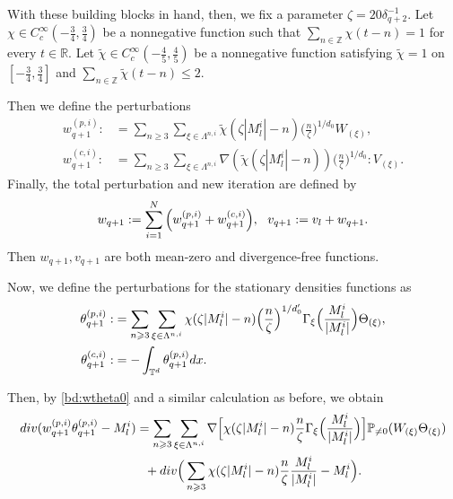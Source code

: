 \documentclass[10pt,a4paper]{amsart}
\numberwithin{equation}{section}
\def\[{{\Big[}}
\def\]{{\Big]}}
\def\({{\Big(}}
\def\){{\Big)}}
\def\dif{{\mathord{{\rm d}}}}
\def\mP{{\mathbb P}}
\def\geq{\geqslant}
\def\leq{\leqslant}
\def\div{\mathord{{\rm div}}}
\def\[{{\Big[}}
\def\]{{\Big]}}
\def\({{\Big(}}
\def\){{\Big)}}
\def\dif{{\mathord{{\rm d}}}}
\def\geq{\geqslant}
\def\leq{\leqslant}
\def\div{\mathord{{\rm div}}}
\begin{document}
With these building blocks in hand, then, we fix a  parameter $\zeta = 20\delta_{q+2}^{-1}$.  Let
$
\chi\in C_c^\infty(-\frac34,\frac34)
$
be a nonnegative function such that
$
\sum_{n\in\mathbb{Z}}\chi(t-n)=1
$
for every $t\in\mathbb{R}$.
Let
$
\tilde{\chi}\in C_c^\infty(-\frac45,\frac45)
$
be a nonnegative function satisfying
$
\tilde{\chi}=1
$
on
$
[-\frac34,\frac34]
$
and
$
\sum_{n\in\mathbb{Z}}\tilde{\chi}(t-n)\leq2.
$

Then we define the perturbations
\begin{align*}
w_{q+1}^{(p,i)}:&=\sum_{n\geq3}\sum_{\xi\in\Lambda^{n,i}}\tilde{\chi}(\zeta |M^i_l|-n)\(\frac{n}{\zeta }\)^{1/d_0}W_{ (\xi)},\\
w_{q+1}^{(c,i)}:&=\sum_{n\geq3}\sum_{\xi\in\Lambda^{n,i}}\nabla( \tilde{\chi}(\zeta |M^i_l|-n))\(\frac{n}{\zeta }\)^{1/{d_0}}:V_{ (\xi)}.
\end{align*}
Finally, the total perturbation and new iteration are defined by
\begin{align}
w_{q+1}:=\sum_{i=1}^N\(w_{q+1}^{(p,i)}+w_{q+1}^{(c,i)}\),\ \ v_{q+1}:=v_l+w_{q+1}.\notag
\end{align} 
Then  $w_{q+1},v_{q+1}$ are both mean-zero and divergence-free functions.

 
Now,  we define the perturbations for the stationary  densities functions as
\begin{align}
\theta_{q+1}^{(p,i)}:&=
\sum_{n\geq3}\sum_{\xi\in\Lambda^{n,i}}\chi(\zeta |M^i_l|-n)\(\frac{n}{\zeta }\)^{1/{d_0'}}\Gamma_{\xi}\(\frac{M^i_l}{|M^i_l|}\)\Theta_{ (\xi)},\notag\\
\theta_{q+1}^{(c,i)}:&=-\int_{\mathbb{T}^d} \theta_{q+1}^{(p,i)}\dif x.\notag
\end{align}

Then, by \eqref{bd:wtheta0} and  a similar calculation as before, we obtain 
\begin{align}
 \div (w_{q+1}^{(p,i)}\theta_{q+1}^{(p,i)}-M^i_l)
&=\sum_{n\geq3}\sum_{\xi\in\Lambda^{n,i}}\nabla\[\chi(\zeta |M^i_l|-n)\frac{n}{\zeta }\Gamma_{\xi}\(\frac{M^i_l}{|M^i_l|}\)\]\mP_{\neq0}(W_{ (\xi)}\Theta_{ (\xi)})\notag\\
 &\ \ +\div \(\sum_{n\geq3}\chi(\zeta |M^i_l|-n)\frac{n}{\zeta }\frac{M^i_l}{|M^i_l|}-M^i_l\). \label{wthetagood}
\end{align} 
\end{document}
